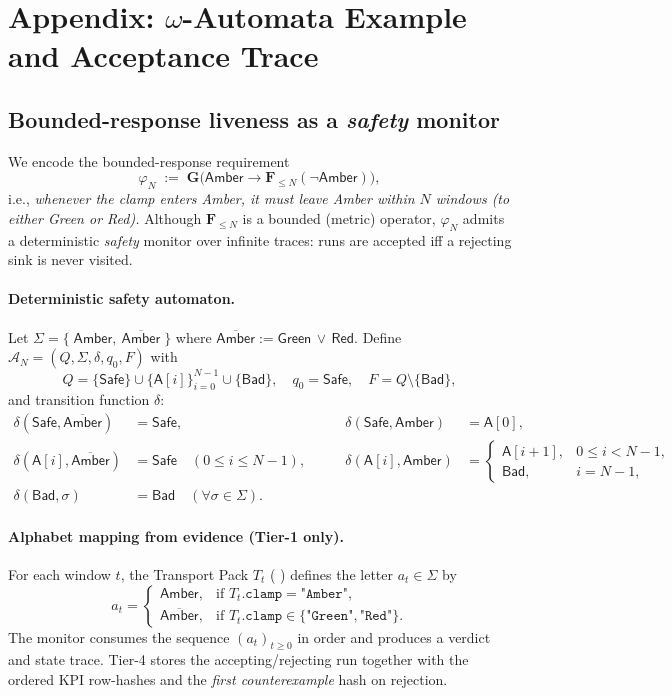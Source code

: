\documentclass[10pt]{article}
\makeatletter
\newcommand{\JSGxref}[2]{%
  \@ifundefined{r@#2}{\textbf{[#1 ??]}}{#1~\ref{#2}}}
\newcommand{\secref}[1]{\JSGxref{§}{#1}}
\makeatother
\begin{document}
\section{Appendix: $\omega$-Automata Example and Acceptance Trace}
\label{sec:omega-appendix}

\subsection{Bounded-response liveness as a \emph{safety} monitor}
We encode the bounded-response requirement
\[
  \varphi_N \;:=\; \mathbf{G}\Big(\textsf{Amber} \rightarrow \mathbf{F}_{\le N}(\neg\textsf{Amber})\Big),
\]
i.e., \emph{whenever the clamp enters \textsf{Amber}, it must leave \textsf{Amber} within $N$ windows (to either \textsf{Green} or \textsf{Red}).}
Although $\mathbf{F}_{\le N}$ is a bounded (metric) operator, $\varphi_N$ admits a deterministic \emph{safety} monitor over infinite traces:
runs are accepted iff a rejecting sink is never visited.

\paragraph{Deterministic safety automaton.}
Let $\Sigma=\{\;\textsf{Amber},\ \overline{\textsf{Amber}}\;\}$ where $\overline{\textsf{Amber}}:=\textsf{Green}\,\lor\,\textsf{Red}$.
Define $\mathcal{A}_N = (Q,\Sigma,\delta,q_0,F)$ with
\[
Q=\{\textsf{Safe}\}\cup\{\textsf{A}[i]\}_{i=0}^{N-1}\cup\{\textsf{Bad}\},\quad
q_0=\textsf{Safe},\quad F=Q\setminus\{\textsf{Bad}\},
\]
and transition function $\delta$:
\[
\begin{aligned}
\delta(\textsf{Safe},\overline{\textsf{Amber}})&=\textsf{Safe}, &
\delta(\textsf{Safe},\textsf{Amber})&=\textsf{A}[0],\\
\delta(\textsf{A}[i],\overline{\textsf{Amber}})&=\textsf{Safe}\quad(0\le i\le N{-}1),\qquad &
\delta(\textsf{A}[i],\textsf{Amber})&=
\begin{cases}
\textsf{A}[i{+}1], & 0\le i<N{-}1,\\
\textsf{Bad}, & i=N{-}1,
\end{cases}\\
\delta(\textsf{Bad},\sigma)&=\textsf{Bad}\quad(\forall \sigma\in\Sigma).&
\end{aligned}
\]

\paragraph{Alphabet mapping from evidence (Tier-1 only).}
For each window $t$, the Transport Pack $T_t$ (\secref{sec:evidence}) defines the letter $a_t\in\Sigma$ by
\[
a_t=\begin{cases}
\textsf{Amber}, & \text{if } T_t.\texttt{clamp}=\texttt{"Amber"},\\
\overline{\textsf{Amber}}, & \text{if } T_t.\texttt{clamp}\in\{\texttt{"Green"},\texttt{"Red"}\}.
\end{cases}
\]
The monitor consumes the sequence $(a_t)_{t\ge0}$ in order and produces a verdict and state trace.
Tier-4 stores the accepting/rejecting run together with the ordered KPI row-hashes and the \emph{first counterexample} hash on rejection.
\end{document}
